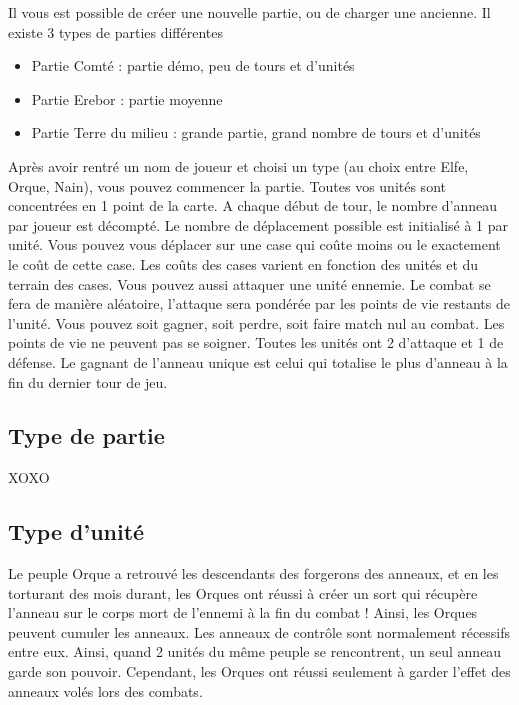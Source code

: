 Il vous est possible de créer une nouvelle partie, ou de charger une ancienne.
Il existe 3 types de parties différentes
\begin{itemize}
\item Partie Comté : partie démo, peu de tours et d'unités
\item Partie Erebor : partie moyenne
\item Partie Terre du milieu : grande partie, grand nombre de tours et d'unités
\newline
\end{itemize}
Après avoir rentré un nom de joueur et choisi un type (au choix entre Elfe, Orque, Nain), vous
pouvez commencer la partie. Toutes vos unités sont concentrées en 1 point de la carte.
\newline
\newline
A chaque début de tour, le nombre d'anneau par joueur est décompté. Le nombre de déplacement possible est initialisé à 1 par unité. 
Vous pouvez vous déplacer sur une case qui coûte moins ou le exactement le coût de cette case. Les coûts des cases varient en fonction des unités et du terrain des cases. 
\newline
\newline
Vous pouvez aussi attaquer une unité ennemie. Le combat se fera de manière aléatoire, l'attaque sera pondérée par les points de vie restants de l'unité. Vous pouvez soit gagner, soit perdre, soit faire match nul au combat. Les points de vie ne peuvent pas se soigner.
Toutes les unités ont 2 d'attaque et 1 de défense.
\newline
\newline
Le gagnant de l'anneau unique est celui qui totalise le plus d'anneau à la fin du dernier tour de jeu.


\subsection{Type de partie}

XOXO

\subsection{Type d'unité}

Le peuple Orque a retrouvé les descendants des forgerons des anneaux, et en les torturant des mois durant, les Orques ont réussi à créer un sort qui récupère l'anneau sur le corps mort de l'ennemi à la fin du combat ! Ainsi, les Orques peuvent cumuler les anneaux.
Les anneaux de contrôle sont normalement récessifs entre eux. Ainsi, quand 2 unités du même peuple se rencontrent, un seul anneau garde son pouvoir. Cependant, les Orques ont réussi seulement à garder l'effet des anneaux volés lors des combats.